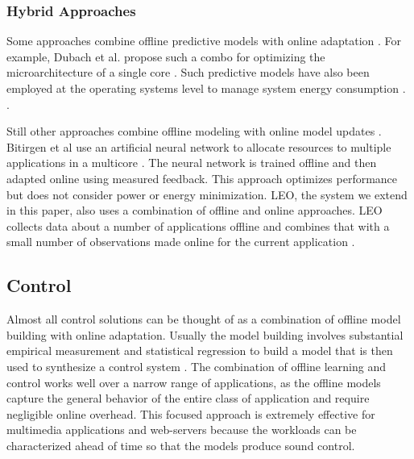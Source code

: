 \subsubsection{Hybrid Approaches}
Some approaches combine offline predictive models with online
adaptation
\cite{Zhang2012,packandcap,Winter2010,dubach2010,Koala,Cinder,
  wu2012inferred}.  For example, Dubach et al.  propose such a combo
for optimizing the microarchitecture of a single core
\cite{dubach2010}.  Such predictive models have also been employed at
the operating systems level to manage system energy consumption \cite{Koala,Cinder}.
\cite{wu2012inferred}.


Still other approaches combine offline modeling with online model
updates \cite{JouleGuard,Bitirgen2008,Ipek}.  Bitirgen et
al use an artificial neural network to allocate resources to multiple
applications in a multicore \cite{Bitirgen2008}.  The neural network
is trained offline and then adapted online using measured feedback.
This approach optimizes performance but does not consider power or
energy minimization.  LEO, the system we extend in this paper, also
uses a combination of offline and online approaches.  LEO collects
data about a number of applications offline and combines that with a
small number of observations made online for the current application
\cite{LEO}.

\subsection{Control}
Almost all control solutions can be thought of as a combination of
offline model building with online adaptation.  Usually the model
building involves substantial empirical measurement and statistical
regression to build a model that is then used to synthesize a control
system
\cite{Wu2004,TCST,Chen2011,PTRADE,POET,ControlWare,Agilos,Rajkumar,Sojka,Raghavendra2008}.
The combination of offline
learning and control works well over a narrow range of applications, as the offline models capture the
general behavior of the entire class of application and require
negligible online overhead.  This focused approach is extremely
effective for multimedia applications
\cite{grace2,flinn99,flinn2004,xtune,TCST} and web-servers
\cite{Horvarth,LuEtAl-2006a,SunDaiPan-2008a} because the workloads can
be characterized ahead of time so that the models produce sound
control.


